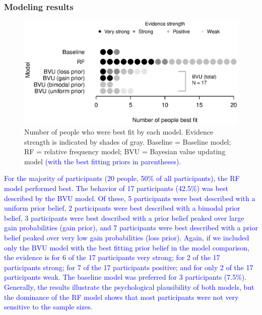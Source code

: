\documentclass[a4paper, man, natbib, floatsintext]{apa6} %
\begin{document}
\subsubsection{Modeling results}

\begin{figure}[htbp] 
  \centering
\includegraphics[width=.8\linewidth, keepaspectratio]{modelcomp_rs2.eps}
  \caption{Number of people who were best fit by each model. Evidence strength is indicated by shades of gray. Baseline = Baseline model; RF = relative frequency model; BVU = Bayesian value updating model \textcolor{blue}{ (with the best fitting priors in parentheses).} }
  \label{fig:modeling2}
\end{figure}

\textcolor{blue}{For the majority of participants (20 people, 50\% of all participants), the RF  model performed best. The behavior of 17 participants (42.5\%) was best described by the BVU model. Of these, 5 participants were best described with a uniform prior belief, 2 participants were best described with a bimodal prior belief, 3 participants were best described with a prior belief peaked over large gain probabilities (gain prior), and 7 participants were best described with a prior belief peaked over very low gain probabilities (loss prior). Again, if we included only the BVU model with the best fitting prior belief in the model comparison, the evidence is for 6 of the 17 participants very strong; for 2 of the 17 participants strong; for 7 of the 17 participants positive; and for only 2 of the 17 participants weak.  The baseline model was preferred for 3 participants (7.5\%). Generally, the results illustrate the psychological plausibility of both models, but the dominance of the RF model shows that most participants were not very sensitive to the sample sizes.} 
\end{document}
